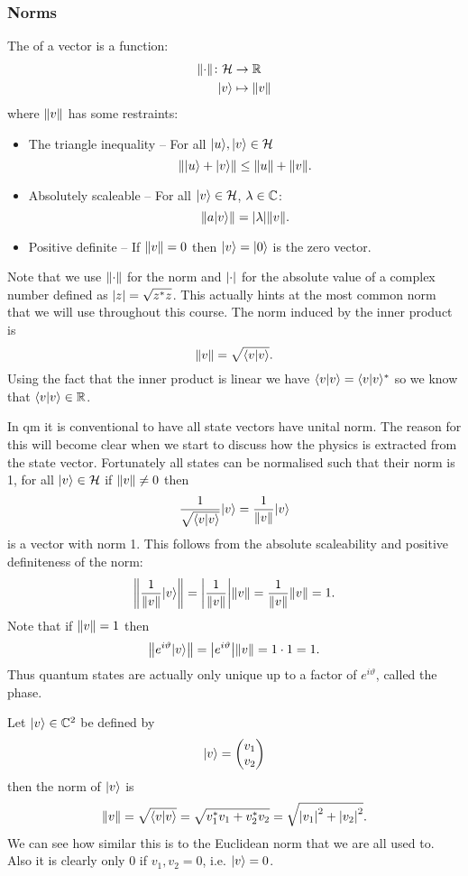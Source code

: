     \subsubsection{Norms}
    The  of a vector is a function:
    \begin{align*}
        \norm{\cdot}\colon\mathcal{H}&\to\mathbb{R}\\
        \vert {v} \rangle &\mapsto \norm{v}
    \end{align*}
    where \(\norm{v}\) has some restraints:
    \begin{itemize}
        \item The triangle inequality -- For all \(\vert {u} \rangle, \vert {v} \rangle\in\mathcal{H}\)
        \[\norm{\vert {u} \rangle + \vert {v} \rangle} \le \norm{u} + \norm{v}.\]
        \item Absolutely scaleable -- For all \(\vert {v} \rangle\in\mathcal{H}\), \(\lambda\in\mathbb{C}\):
        \[\norm{a\vert {v} \rangle} = \abs{\lambda}\norm{v}.\]
        \item Positive definite -- If \(\norm{v} = 0\) then \(\vert {v} \rangle = \vert {0} \rangle\) is the zero vector.
    \end{itemize}
    Note that we use \(\norm{\cdot}\) for the norm and \(\abs{\cdot}\) for the absolute value of a complex number defined as \(\abs{z} = \sqrt{z^*z}\).
    This actually hints at the most common norm that we will use throughout this course.
    The norm induced by the inner product is
    \[\norm{v} = \sqrt{\langle {v} \vert {v} \rangle}.\]
    Using the fact that the inner product is linear we have \(\langle {v} \vert {v} \rangle = \langle {v} \vert {v} \rangle^*\) so we know that \(\langle {v} \vert {v} \rangle\in\mathbb{R}\).
    
    In \acrshort{qm} it is conventional to have all state vectors have unital norm.
    The reason for this will become clear when we start to discuss how the physics is extracted from the state vector.
    Fortunately all states can be normalised such that their norm is 1,
    for all \(\vert {v} \rangle\in\mathcal{H}\) if \(\norm{v}\ne 0\) then
    \[\frac{1}{\sqrt{\langle {v} \vert {v} \rangle}}\vert {v} \rangle = \frac{1}{\norm{v}}\vert {v} \rangle\]
    is a vector with norm 1.
    This follows from the absolute scaleability and positive definiteness of the norm:
    \[\norm{\frac{1}{\norm{v}}\vert {v} \rangle} = \abs{\frac{1}{\norm{v}}}\norm{v} = \frac{1}{\norm{v}}\norm{v} = 1.\]
    Note that if \(\norm{v} = 1\) then
    \[\norm{e^{i\vartheta}\vert {v} \rangle} = \abs{e^{i\vartheta}}\norm{v} = 1\cdot 1 = 1.\]
    Thus quantum states are actually only unique up to a factor of \(e^{i\vartheta}\), called the phase.
    \begin{example}
        Let \(\vert {v} \rangle\in\mathbb{C}^2\) be defined by
        \[
            \vert {v} \rangle = 
            \begin{pmatrix}
                v_1\\ v_2
            \end{pmatrix}
        \]
        then the norm of \(\vert {v} \rangle\) is
        \[\norm{v} = \sqrt{\langle {v} \vert {v} \rangle} = \sqrt{v_1^*v_1 + v_2^*v_2} = \sqrt{\abs{v_1}^2 + \abs{v_2}^2}.\]
        We can see how similar this is to the Euclidean norm that we are all used to.
        Also it is clearly only \(0\) if \(v_1, v_2 = 0\), i.e. \(\vert {v} \rangle = 0\).
    \end{example}
    
